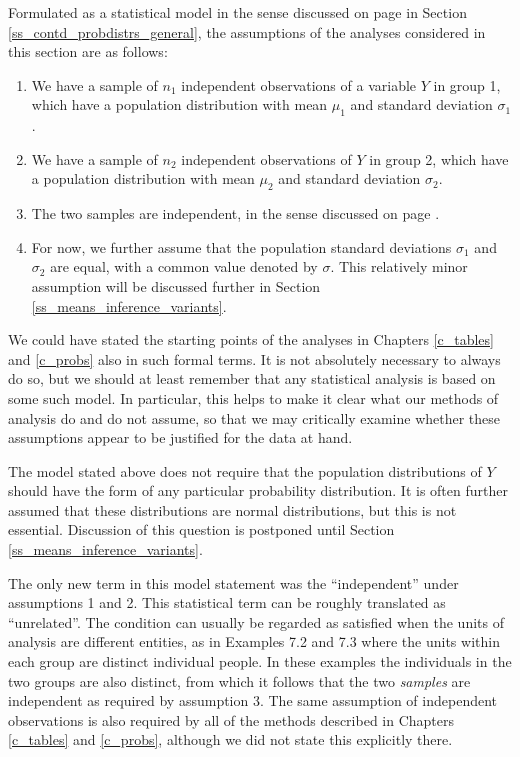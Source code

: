 Formulated as a statistical model in the sense discussed on page
\pageref{p_model} in Section \ref{ss_contd_probdistrs_general}, the
assumptions of the analyses considered in this section are as follows:
\begin{enumerate}
\item
\label{p_2sample}
We have a sample of $n_{1}$ independent observations of a variable $Y$
in group 1, which have a population distribution with mean $\mu_{1}$ and
standard deviation $\sigma_{1}$.
\item
We have a sample of $n_{2}$ independent observations of $Y$
in group 2, which have a population distribution with mean $\mu_{2}$ and
standard deviation $\sigma_{2}$.
\item
The two samples are independent, in the sense discussed on page
\pageref{p_depsamples}.
\item
For now, we further assume that the population standard
deviations $\sigma_{1}$ and $\sigma_{2}$ are equal, with a common value
denoted by $\sigma$.
This relatively minor assumption will be discussed
further in Section
\ref{ss_means_inference_variants}.
\end{enumerate}
We could have stated the starting points of the analyses in Chapters
\ref{c_tables} and \ref{c_probs} also in such formal terms. It is not
absolutely necessary to always do so, but we should at least remember
that any statistical analysis is based on some such
model. In particular, this helps to make it clear what our methods of
analysis do and do not assume, so that we may critically examine
whether these assumptions appear to be justified for the data at hand.

The model stated above does not require that the population
distributions of $Y$ should have the form of any particular probability
distribution. It is often further assumed that these distributions are
normal distributions, but this is not essential. Discussion of this
question is postponed until  Section \ref{ss_means_inference_variants}.

The only new term in this model statement was the ``independent'' under
assumptions 1 and 2. This statistical term can be roughly translated as
``unrelated''. The condition can usually
be regarded as satisfied when the units of analysis are different
entities, as in Examples 7.2 and 7.3 where the units within each group
are distinct individual people. In these examples the individuals in the
two groups are also distinct, from which it follows that the two \emph{samples} are independent as
required by assumption 3. The same assumption of independent
observations is also required by all of the  methods described in
Chapters \ref{c_tables} and \ref{c_probs}, although we did not state
this explicitly there.

